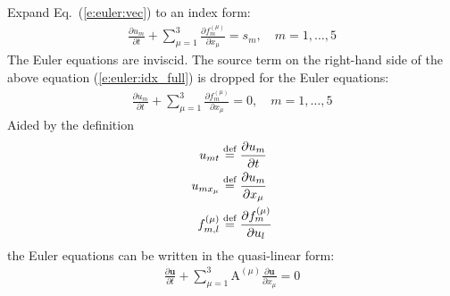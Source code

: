 \documentclass{turgon}
\begin{document}
Expand Eq.~(\ref{e:euler:vec}) to an index form:
%
\begin{align}
  \frac{\partial u_m}{\partial t}
  + \sum_{\mu=1}^3 \frac{\partial f^{(\mu)}_m}{\partial x_{\mu}}
  = s_m, \quad m = 1, \ldots, 5
  \label{e:euler:idx_full}
\end{align}
%
The Euler equations are inviscid.
The source term on the right-hand side of the above equation
(\ref{e:euler:idx_full}) is dropped for the Euler equations:
%
\begin{align}
  \frac{\partial u_m}{\partial t}
  + \sum_{\mu=1}^3 \frac{\partial f^{(\mu)}_m}{\partial x_{\mu}}
  = 0, \quad m = 1, \ldots, 5
  \label{e:euler:idx}
\end{align}
%
Aided by the definition
%
\begin{align*}
  u_{mt} &\defeq \frac{\partial u_m}{\partial t} \\
  u_{mx_{\mu}} &\defeq \frac{\partial u_m}{\partial x_{\mu}} \\
  f^{(\mu)}_{m,l} &\defeq \frac{\partial f^{(\mu)}_m}{\partial u_l}
\end{align*}
%
the Euler equations can be written in the quasi-linear form:
%
\begin{align}
  \frac{\partial\mathbf{u}}{\partial t} + \sum_{\mu=1}^3
  \mathrm{A}^{(\mu)} \frac{\partial\mathbf{u}}{\partial x_{\mu}} = 0
  \label{e:euler:qlinear}
\end{align}
\end{document}
